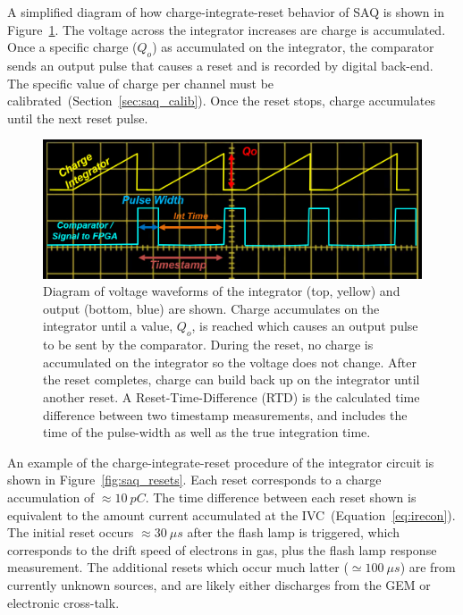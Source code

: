 A simplified diagram of how charge-integrate-reset behavior of SAQ is shown in Figure~\ref{fig:saq_reconstruction}.
The voltage across the integrator increases are charge is accumulated.
Once a specific charge ($Q_{o}$) as accumulated on the integrator, the comparator sends an output pulse that causes a reset and is recorded by digital back-end.
The specific value of charge per channel must be calibrated~(Section~\ref{sec:saq_calib}).
Once the reset stops, charge accumulates until the next reset pulse.

\begin{figure}[]
\centering
\includegraphics[width=\textwidth]{images/saq_example_reconstruction.png}
\caption{Diagram of voltage waveforms of the integrator (top, yellow) and output (bottom, blue) are shown.
Charge accumulates on the integrator until a value, $Q_{o}$, is reached which causes an output pulse to be sent by the comparator.
During the reset, no charge is accumulated on the integrator so the voltage does not change.
After the reset completes, charge can build back up on the integrator until another reset.
A Reset-Time-Difference (RTD) is the calculated time difference between two timestamp measurements, and includes the time of the pulse-width as well as the true integration time.
}
\label{fig:saq_reconstruction}
\end{figure}

An example of the charge-integrate-reset procedure of the integrator circuit is shown in Figure~\ref{fig:saq_resets}.
Each reset corresponds to a charge accumulation of $\approx 10~\unit{pC}$.
The time difference between each reset shown is equivalent to the amount current accumulated at the IVC~(Equation~\ref{eq:irecon}).
The initial reset occurs $\approx 30~\unit{\mu s}$ after the flash lamp is triggered, which corresponds to the drift speed of electrons in gas, plus the flash lamp response measurement.
The additional resets which occur much latter ($\simeq 100~\unit{\mu s}$) are from currently unknown sources, and are likely either discharges from the GEM or electronic cross-talk.

